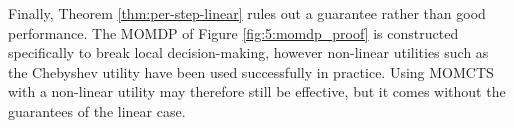     Finally, Theorem \ref{thm:per-step-linear} rules out a guarantee rather than good performance. The MOMDP of Figure \ref{fig:5:momdp_proof} is constructed specifically to break local decision-making, however non-linear utilities such as the Chebyshev utility have been used successfully in practice. Using MOMCTS with a non-linear utility may therefore still be effective, but it comes without the guarantees of the linear case.







    
    

